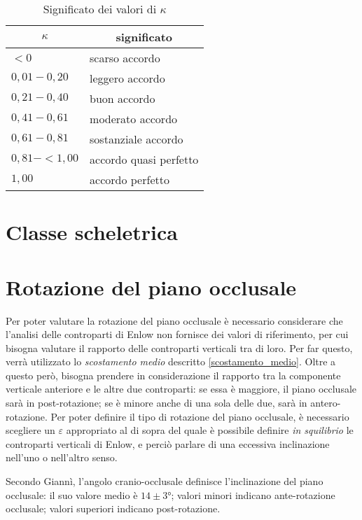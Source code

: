\begin{table}
\centering
\caption{Significato dei valori di $\kappa$}
\label{tab:significato_kappa}
\begin{tabular}{ll}
\toprule
\multicolumn{1}{c}{\textbf{$\kappa$}} & \multicolumn{1}{c}{significato} \\
\midrule
$< 0$ & scarso accordo \\
$0,01 - 0,20$ & leggero accordo \\
$0,21 - 0,40$ & buon accordo \\
$0,41 - 0,61$ & moderato accordo \\
$0,61 - 0,81$ & sostanziale accordo \\
$0,81 - < 1,00$ & accordo quasi perfetto \\
$1,00$ & accordo perfetto \\
\bottomrule
\end{tabular}
\end{table}

\section{Classe scheletrica}

\section{Rotazione del piano occlusale}
Per poter valutare la rotazione del piano occlusale è necessario considerare che l'analisi delle controparti di Enlow non fornisce dei valori di riferimento, per cui bisogna valutare il rapporto delle controparti verticali tra di loro. Per far questo, verrà utilizzato lo \emph{scostamento medio} descritto \vref{scostamento_medio}. Oltre a questo però, bisogna prendere in considerazione il rapporto tra la componente verticale anteriore e le altre due controparti: se essa è maggiore, il piano occlusale sarà in post-rotazione; se è minore anche di una sola delle due, sarà in antero-rotazione. Per poter definire il tipo di rotazione del piano occlusale, è necessario scegliere un $\varepsilon$ appropriato al di sopra del quale è possibile definire \emph{in squilibrio} le controparti verticali di Enlow, e perciò parlare di una eccessiva inclinazione nell'uno o nell'altro senso.

Secondo Giannì, l'angolo cranio-occlusale definisce l'inclinazione del piano occlusale: il suo valore medio è $14 \pm 3°$; valori minori indicano ante-rotazione occlusale; valori superiori indicano post-rotazione.

